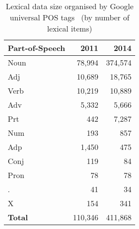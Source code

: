\documentclass[11pt]{article}
\begin{document}
\begin{table}[h]
    \begin{center}
        \begin{tabular}{|l|rr|}
            \hline
            \bf Part-of-Speech & \bf 2011 & \bf 2014 \\
            \hline
            \sc Noun           & 78,994   & 374,574 \\
            \sc Adj            & 10,689   & 18,765 \\
            \sc Verb           & 10,219   & 10,889 \\
            \sc Adv            & 5,332    & 5,666 \\
            \sc Prt            & 442      & 7,287 \\
            \sc Num            & 193      & 857 \\
            \sc Adp            & 1,450    & 475 \\
            \sc Conj           & 119      & 84 \\
            \sc Pron           & 78       & 78 \\
            \sc .              & 41       & 34 \\
            \sc X              & 154      & 341 \\
            \hline
            \bf Total          & 110,346  & 411,868 \\
            \hline
        \end{tabular}
    \end{center}
    \caption{Lexical data size organised by Google universal
    POS tags~\cite{petrov2011universal} (by number of lexical items)}
\end{table}
\end{document}

